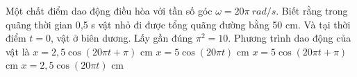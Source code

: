   \begin{ex}%
  	Một chất điểm dao động điều hòa với tần số góc $\omega=20\pi\ rad/s$. Biết rằng trong quãng thời gian 0,5 s vật nhỏ đi được tổng quãng đường bằng 50 cm. Và tại thời điểm $t = 0$, vật ở biên dương. Lấy gần đúng $\pi^2 = 10$. Phương trình dao động của vật là
  	\choice 
  	{$x = 2,5\cos(20\pi t + \pi)$ cm}
  	{$x = 5\cos(20\pi t)$ cm}
  	{$x = 5\cos(20\pi t + \pi)$ cm}
  	{\True $x = 2,5\cos(20\pi t)$ cm}
  \end{ex} 
  
